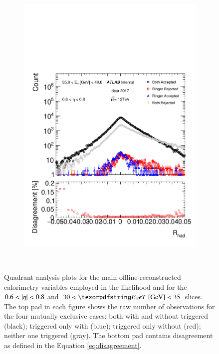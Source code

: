 \begin{figure}[h!]
\begin{subfigure}[c]{.49\textwidth}
\includegraphics[width=\textwidth]{sections/05_analysis/figures/quadrant_plots/rhad.pdf}
\caption{}
\end{subfigure} \\


\caption{\label{fig:quadrant_calo_variables_30GeV}
	Quadrant analysis plots for the main offline-reconstructed
	calorimetry variables employed in the
	likelihood and for the $0.6<\abseta{}<0.8$ and
	$30<\et{}~[\text{GeV}]<35$ slices. 
	The top pad in each figure shows the raw number of observations for the four mutually exclusive cases: both with and without \rnn{}
	triggered (black); triggered only with \rnn{} (blue); triggered only without \rnn{} (red); neither one triggered (gray). The bottom pad contains disagreement as defined in the Equation \eqref{eq:disagreement}.
}
\end{figure}

